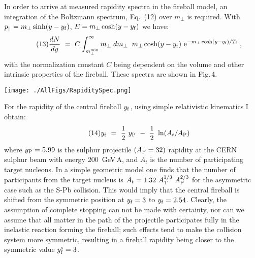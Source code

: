 \begin{mdframed}[linecolor=gray,roundcorner=12pt,backgroundcolor=Dandelion!15,linewidth=1pt,leftmargin=0cm,rightmargin=0cm,topline=true,bottomline=true,skipabove=12pt]
In order to arrive at measured rapidity spectra in the fireball model, an integration of the Boltzmann spectrum, Eq.~(12) over $m_\bot$ is required. With $p_\parallel = m_\bot \sinh (y-y_{\rm f})$, $E=m_\bot \cosh (y-y_{\rm f})$ we have:
\begin{equation}
\tag{13} \frac{dN}{dy} ~=~ C
\int_{m_\bot^{\rm min}}^{\infty}m_\bot\;dm_\bot\;\; m_\bot
\cosh(y-y_{\rm f})~{\rm e}^{-m_\bot\cosh(y-y_{\rm f})/T_{\rm f}}
 \;,
\end{equation}
with the normalization constant $C$ being dependent on the volume and
other intrinsic properties of the fireball.
These spectra are shown in Fig.\,4. %

\centerline{\texttt{[image: ./AllFigs/RapiditySpec.png]}}
{}

For the rapidity of the
central fireball $y_{\rm f}$, using simple relativistic kinematics I
obtain:
\begin{equation}
\tag{14} y_{\rm f} ~=~ {\textstyle 1\over2} ~y_{\rm P}~-~{\textstyle
1\over2} ~\ln(A_t/A_{\rm P})
\end{equation}
where $y_{\rm P}=5.99$ is the sulphur projectile $(A_{\rm P}=32)$
rapidity at the CERN sulphur beam with energy 200~GeV\,A, and $A_t$ is
the number of participating target nucleons. In a simple geometric model
one finds that the number of participants from the target nucleus is
$A_t=1.32~A_{\rm T}^{1/3} ~A_{\rm P}^{2/3}$ for the asymmetric case such
as the S-Pb collision. This would imply that the central fireball is
shifted from the symmetric position at $y_{\rm f}=3$ to $y_{\rm f}=2.54$. 
Clearly, the assumption of complete stopping can not be made with
certainty, nor can we assume that all matter in the path of the
projectile participates fully in the inelastic reaction forming the
fireball; such effects tend to make the collision system more symmetric,
resulting in a fireball rapidity being closer to the symmetric value
$y_{\rm f}^{\rm s}=3$. 
 

\end{mdframed}
